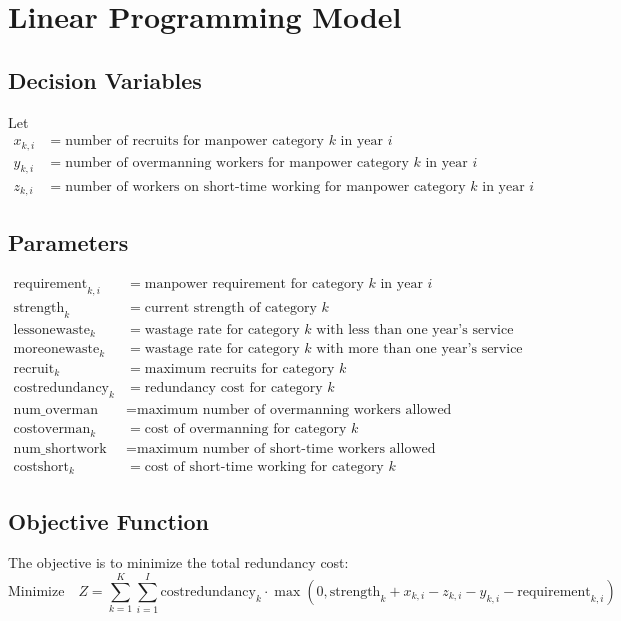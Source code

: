 \documentclass{article}
\begin{document}
\section*{Linear Programming Model}

\subsection*{Decision Variables}
Let 
\begin{align*}
x_{k,i} & = \text{number of recruits for manpower category } k \text{ in year } i \\
y_{k,i} & = \text{number of overmanning workers for manpower category } k \text{ in year } i \\
z_{k,i} & = \text{number of workers on short-time working for manpower category } k \text{ in year } i
\end{align*}

\subsection*{Parameters}
\begin{align*}
\text{requirement}_{k,i} & = \text{manpower requirement for category } k \text{ in year } i \\
\text{strength}_{k} & = \text{current strength of category } k \\
\text{lessonewaste}_{k} & = \text{wastage rate for category } k \text{ with less than one year's service} \\
\text{moreonewaste}_{k} & = \text{wastage rate for category } k \text{ with more than one year's service} \\
\text{recruit}_{k} & = \text{maximum recruits for category } k \\
\text{costredundancy}_{k} & = \text{redundancy cost for category } k \\
\text{num\_overman} & = \text{maximum number of overmanning workers allowed} \\
\text{costoverman}_{k} & = \text{cost of overmanning for category } k \\
\text{num\_shortwork} & = \text{maximum number of short-time workers allowed} \\
\text{costshort}_{k} & = \text{cost of short-time working for category } k
\end{align*}

\subsection*{Objective Function}
The objective is to minimize the total redundancy cost:
\begin{equation}
\text{Minimize} \quad Z = \sum_{k=1}^{K} \sum_{i=1}^{I} \text{costredundancy}_{k} \cdot \max(0, \text{strength}_{k} + x_{k,i} - z_{k,i} - y_{k,i} - \text{requirement}_{k,i})
\end{equation}
\end{document}
